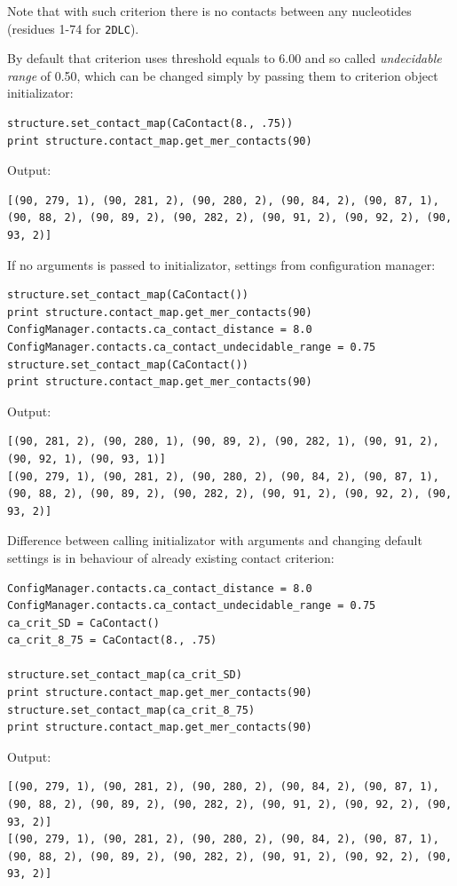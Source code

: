 \documentclass{article}
\begin{document}
Note that with such criterion there is no contacts between any nucleotides (residues 1-74 for \texttt{2DLC}).

By default that criterion uses threshold equals to 6.00 and so called \textit{undecidable range} of 0.50, which can be changed simply by passing them to criterion object initializator:

\begin{lstlisting}
structure.set_contact_map(CaContact(8., .75))
print structure.contact_map.get_mer_contacts(90)
\end{lstlisting}
Output:
\begin{lstlisting}
[(90, 279, 1), (90, 281, 2), (90, 280, 2), (90, 84, 2), (90, 87, 1), (90, 88, 2), (90, 89, 2), (90, 282, 2), (90, 91, 2), (90, 92, 2), (90, 93, 2)]
\end{lstlisting}

If no arguments is passed to initializator, settings from configuration manager:

\begin{lstlisting}
structure.set_contact_map(CaContact())
print structure.contact_map.get_mer_contacts(90)
ConfigManager.contacts.ca_contact_distance = 8.0
ConfigManager.contacts.ca_contact_undecidable_range = 0.75
structure.set_contact_map(CaContact())
print structure.contact_map.get_mer_contacts(90)
\end{lstlisting}
Output:
\begin{lstlisting}
[(90, 281, 2), (90, 280, 1), (90, 89, 2), (90, 282, 1), (90, 91, 2), (90, 92, 1), (90, 93, 1)]
[(90, 279, 1), (90, 281, 2), (90, 280, 2), (90, 84, 2), (90, 87, 1), (90, 88, 2), (90, 89, 2), (90, 282, 2), (90, 91, 2), (90, 92, 2), (90, 93, 2)]
\end{lstlisting}

Difference between calling initializator with arguments and changing default settings is in behaviour of already existing contact criterion:

\begin{lstlisting}
ConfigManager.contacts.ca_contact_distance = 8.0
ConfigManager.contacts.ca_contact_undecidable_range = 0.75
ca_crit_SD = CaContact()
ca_crit_8_75 = CaContact(8., .75)

structure.set_contact_map(ca_crit_SD)
print structure.contact_map.get_mer_contacts(90)
structure.set_contact_map(ca_crit_8_75)
print structure.contact_map.get_mer_contacts(90)
\end{lstlisting}
Output:
\begin{lstlisting}
[(90, 279, 1), (90, 281, 2), (90, 280, 2), (90, 84, 2), (90, 87, 1), (90, 88, 2), (90, 89, 2), (90, 282, 2), (90, 91, 2), (90, 92, 2), (90, 93, 2)]
[(90, 279, 1), (90, 281, 2), (90, 280, 2), (90, 84, 2), (90, 87, 1), (90, 88, 2), (90, 89, 2), (90, 282, 2), (90, 91, 2), (90, 92, 2), (90, 93, 2)]
\end{lstlisting}
\end{document}
